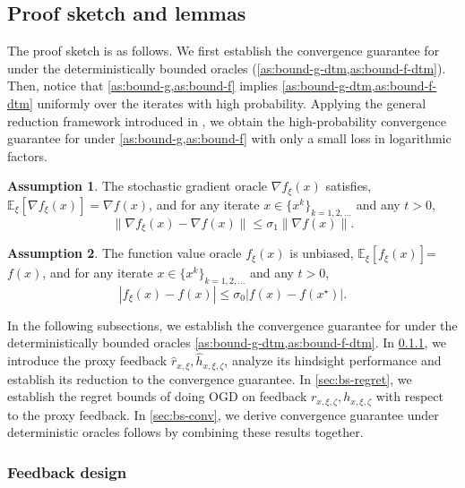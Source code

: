 \documentclass{article}
\theoremstyle{definition}
\newtheorem{assumption}{Assumption}[section]
\DeclareRobustCommand{\namerefc}[2]{\hyperref[#2]{\textcolor{#1}{\nameref*{#2}}}}
\newcommand{\osgd}{\namerefc{purple}{alg:sosgm}}
\begin{document}
\subsection{Proof sketch and lemmas}
The proof sketch is as follows. We first establish the convergence guarantee for {\osgd} under the deterministically bounded oracles (\cref{as:bound-g-dtm,as:bound-f-dtm}). Then, notice that \cref{as:bound-g,as:bound-f} implies \cref{as:bound-g-dtm,as:bound-f-dtm} uniformly over the iterates with high probability. Applying the general reduction framework introduced in \cite{attia2024note}, we obtain the high-probability convergence guarantee for {\osgd} under \cref{as:bound-g,as:bound-f} with only a small loss in logarithmic factors.


\begin{assumption}
  \label{as:bound-g-dtm}
  The stochastic gradient oracle $\nabla f_{\xi} (x)$ satisfies, $\mathbb{E}_{\xi} [\nabla f_{\xi} (x)]={\nabla}f (x)$, and for any iterate $x \in \{ x^k \}_{k = 1, 2, \ldots}$ and any $t > 0$,
    \begin{equation*}
    \| \nabla f_{\xi} (x) - \nabla f (x) \| \leq \sigma_1 \| \nabla f (x) \|.
    \end{equation*}
\end{assumption}

\begin{assumption}
  \label{as:bound-f-dtm}
  The function value oracle $f_{\xi} (x)$ is unbiased,
    $\mathbb{E}_{\xi} [f_{\xi} (x)]$=$f (x)$, and for any iterate 
  $x \in \{x^k\}_{k=1,2,\ldots}$ and any $t>0$,
  \begin{equation*}
    | f_{\xi} (x) - f (x) | \leq \sigma_0 | f (x) - f (x^{\star}) | .
  \end{equation*}
\end{assumption}

In the following subsections, we establish the convergence guarantee for {\osgd} under the deterministically bounded oracles \cref{as:bound-g-dtm,as:bound-f-dtm}.
In \cref{sec:bs-feedback}, we introduce the proxy feedback $\hat{r}_{x, \xi}, \hat{h}_{x, \xi, \zeta}$, analyze its hindsight performance and establish its reduction to the convergence guarantee.
In \cref{sec:bs-regret}, we establish the regret bounds of doing OGD on feedback $r_{x, \xi, \zeta}, h_{x, \xi, \zeta}$ with respect to the proxy feedback. 
In \cref{sec:bs-conv}, we derive convergence guarantee under deterministic oracles follows by combining these results together.

\subsubsection{Feedback design}\label{sec:bs-feedback}
\end{document}
